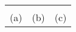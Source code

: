 \documentclass{article}
\begin{document}
  \begin{tabular}{ccc}
     &
     &
    \\
  {\small (a)} & {\small (b)} & {\small (c)}\\
  \end{tabular}
\end{document}
